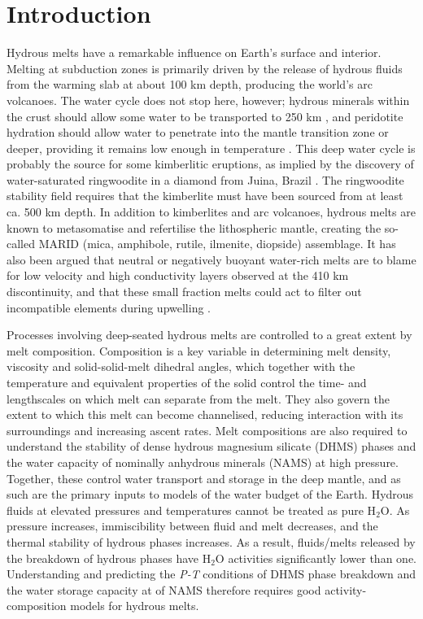 \documentclass[review]{elsarticle}
\begin{document}
\linenumbers

\section{Introduction}
Hydrous melts have a remarkable influence on Earth's surface and interior. Melting at subduction zones is primarily driven by the release of hydrous fluids from the warming slab at about 100 km depth, producing the world's arc volcanoes. The water cycle does not stop here, however; hydrous minerals within the crust should allow some water to be transported to 250 km \citep{PS2002}, and peridotite hydration should allow water to penetrate into the mantle transition zone or deeper, providing it remains low enough in temperature \citep{KOM2005}. This deep water cycle is probably the source for some kimberlitic eruptions, as implied by the discovery of water-saturated ringwoodite in a diamond from Juina, Brazil \citep{Pearsonetal2014}. The ringwoodite stability field requires that the kimberlite must have been sourced from at least ca. 500 km depth. In addition to kimberlites and arc volcanoes, hydrous melts are known to metasomatise and refertilise the lithospheric mantle, creating the so-called MARID (mica, amphibole, rutile, ilmenite, diopside) assemblage. It has also been argued that neutral or negatively buoyant water-rich melts are to blame for low velocity and high conductivity layers observed at the 410 km discontinuity, and that these small fraction melts could act to filter out incompatible elements during upwelling \citep{BK2003}. 

Processes involving deep-seated hydrous melts are controlled to a great extent by melt composition. Composition is a key variable in determining melt density, viscosity and solid-solid-melt dihedral angles, which together with the temperature and equivalent properties of the solid control the time- and lengthscales on which melt can separate from the melt. They also govern the extent to which this melt can become channelised, reducing interaction with its surroundings and increasing ascent rates. Melt compositions are also required to understand the stability of dense hydrous magnesium silicate (DHMS) phases and the water capacity of nominally anhydrous minerals (NAMS) at high pressure. Together, these control water transport and storage in the deep mantle, and as such are the primary inputs to models of the water budget of the Earth. Hydrous fluids at elevated pressures and temperatures cannot be treated as pure H$_2$O. As pressure increases, immiscibility between fluid and melt decreases, and the thermal stability of hydrous phases increases. As a result, fluids/melts released by the breakdown of hydrous phases have H$_2$O activities significantly lower than one. Understanding and predicting the \emph{P-T} conditions of DHMS phase breakdown and the water storage capacity at of NAMS therefore requires good activity-composition models for hydrous melts.
\end{document}
